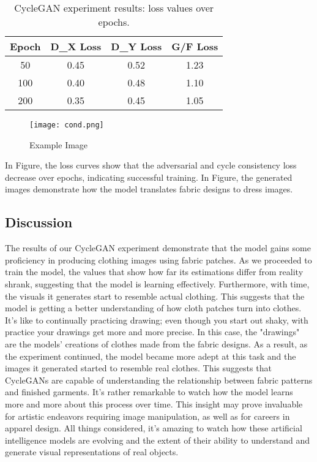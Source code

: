 \documentclass{article}
\begin{document}
\begin{table}[h]
    \centering
    \begin{tabular}{cccc}
        \toprule
        \textbf{Epoch} & \textbf{D\_X Loss} & \textbf{D\_Y Loss} & \textbf{G/F Loss} \\
        \midrule
        50 & 0.45 & 0.52 & 1.23 \\
        100 & 0.40 & 0.48 & 1.10 \\
        200 & 0.35 & 0.45 & 1.05 \\
        \bottomrule
    \end{tabular}
    \caption{CycleGAN experiment results: loss values over epochs.}
    \label{tab:cyclegan_results}
\end{table}

\begin{figure}[h]
    \centering
    \texttt{[image: cond.png]}
    \caption{Example Image}
    \label{fig:example}
\end{figure}


In Figure, the loss curves show that the adversarial and cycle consistency loss decrease over epochs, indicating successful training. In Figure, the generated images demonstrate how the model translates fabric designs to dress images.

\subsection{Discussion}
The results of our CycleGAN experiment demonstrate that the model gains some proficiency in producing clothing images using fabric patches. As we proceeded to train the model, the values that show how far its estimations differ from reality shrank, suggesting that the model is learning effectively. Furthermore, with time, the visuals it generates start to resemble actual clothing. This suggests that the model is getting a better understanding of how cloth patches turn into clothes. It's like to continually practicing drawing; even though you start out shaky, with practice your drawings get more and more precise. In this case, the "drawings" are the models' creations of clothes made from the fabric designs.
As a result, as the experiment continued, the model became more adept at this task and the images it generated started to resemble real clothes. This suggests that CycleGANs are capable of understanding the relationship between fabric patterns and finished garments. It's rather remarkable to watch how the model learns more and more about this process over time. This insight may prove invaluable for artistic endeavors requiring image manipulation, as well as for careers in apparel design. All things considered, it's amazing to watch how these artificial intelligence models are evolving and the extent of their ability to understand and generate visual representations of real objects.
\end{document}
